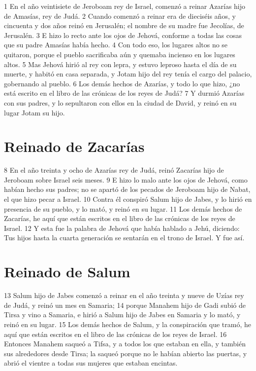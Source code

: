  

1 En el año veintisiete de Jeroboam rey de Israel, comenzó a reinar Azarías hijo de Amasías, rey de Judá.
2 Cuando comenzó a reinar era de dieciséis años, y cincuenta y dos años reinó en Jerusalén; el nombre de su madre fue Jecolías, de Jerusalén.
3 E hizo lo recto ante los ojos de Jehová, conforme a todas las cosas que su padre Amasías había hecho.
4 Con todo eso, los lugares altos no se quitaron, porque el pueblo sacrificaba aún y quemaba incienso en los lugares altos.
5 Mas Jehová hirió al rey con lepra, y estuvo leproso hasta el día de su muerte, y habitó en casa separada, y Jotam hijo del rey tenía el cargo del palacio, gobernando al pueblo.
6 Los demás hechos de Azarías, y todo lo que hizo, ¿no está escrito en el libro de las crónicas de los reyes de Judá?
7 Y durmió Azarías con sus padres, y lo sepultaron con ellos en la ciudad de David, y reinó en su lugar Jotam su hijo.
\section*{Reinado de Zacarías}

8 En el año treinta y ocho de Azarías rey de Judá, reinó Zacarías hijo de Jeroboam sobre Israel seis meses.
9 E hizo lo malo ante los ojos de Jehová, como habían hecho sus padres; no se apartó de los pecados de Jeroboam hijo de Nabat, el que hizo pecar a Israel.
10 Contra él conspiró Salum hijo de Jabes, y lo hirió en presencia de su pueblo, y lo mató, y reinó en su lugar.
11 Los demás hechos de Zacarías, he aquí que están escritos en el libro de las crónicas de los reyes de Israel.
12 Y esta fue la palabra de Jehová que había hablado a Jehú, diciendo: Tus hijos hasta la cuarta generación se sentarán en el trono de Israel. Y fue así.
\section*{Reinado de Salum}

13 Salum hijo de Jabes comenzó a reinar en el año treinta y nueve de Uzías rey de Judá, y reinó un mes en Samaria;
14 porque Manahem hijo de Gadi subió de Tirsa y vino a Samaria, e hirió a Salum hijo de Jabes en Samaria y lo mató, y reinó en su lugar.
15 Los demás hechos de Salum, y la conspiración que tramó, he aquí que están escritos en el libro de las crónicas de los reyes de Israel.
16 Entonces Manahem saqueó a Tifsa, y a todos los que estaban en ella, y también sus alrededores desde Tirsa; la saqueó porque no le habían abierto las puertas, y abrió el vientre a todas sus mujeres que estaban encintas.
